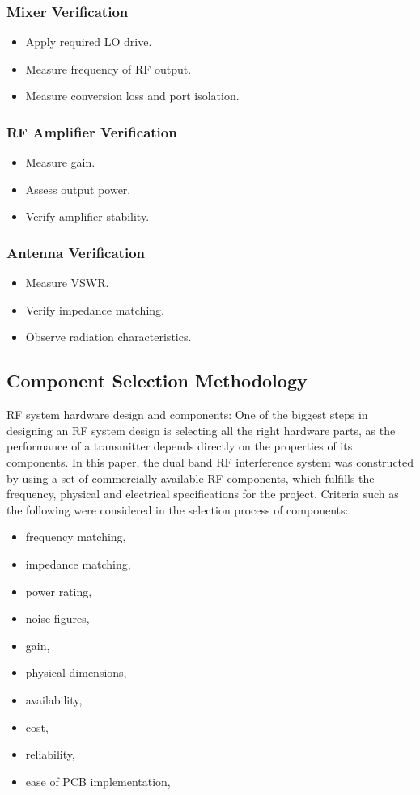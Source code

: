 \documentclass[12pt,a4paper]{report}
\begin{document}
	\subsubsection{Mixer Verification}
	\begin{itemize}
		\item Apply required LO drive.
		\item Measure frequency of RF output.
		\item Measure conversion loss and port isolation.
	\end{itemize}
	
	\subsubsection{RF Amplifier Verification}
	\begin{itemize}
		\item Measure gain.
		\item Assess output power.
		\item Verify amplifier stability.
	\end{itemize}
	
	\subsubsection{Antenna Verification}
	\begin{itemize}
		\item Measure VSWR.
		\item Verify impedance matching.
		\item Observe radiation characteristics.
	\end{itemize}
	\subsection{Component Selection Methodology}
	RF system hardware design and components: One of the biggest steps in designing an RF system design is selecting all the right hardware parts, as the performance of a transmitter depends directly on the properties of its components. In this paper, the dual band RF interference system was constructed by using a set of commercially available RF components, which fulfills the frequency, physical and electrical specifications for the project. Criteria such as the following were considered in the selection process of components:
	
	\begin{itemize}
		\item frequency matching,
		\item impedance matching,
		\item power rating,
		\item noise figures,
		\item gain,
		\item physical dimensions,
		\item availability,
		\item cost,
		\item reliability,
		\item ease of PCB implementation,
	\end{itemize}
	
\end{document}
